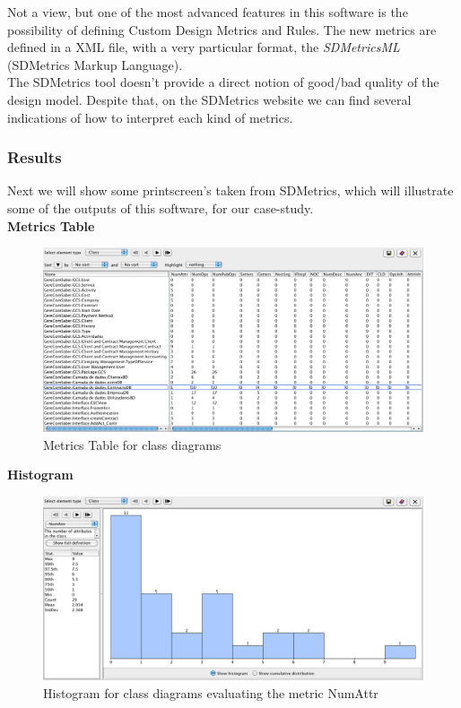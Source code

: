Not a view, but one of the most advanced features in this software is the possibility of defining Custom Design Metrics and Rules. The new metrics are defined in a XML file, with a very particular format, the \textit{SDMetricsML} (SDMetrics Markup Language). \\
The SDMetrics tool doesn't provide a direct notion of good/bad quality of the design model. Despite that, on the SDMetrics website we can find several indications of how to interpret each kind of metrics. 
 
\subsubsection{Results}

Next we will show some printscreen's taken from SDMetrics, which will illustrate some of the outputs of this software, for our case-study.\\

\textbf{Metrics Table}
\begin{figure}[H]
\begin{center}
\includegraphics[width=1\textwidth]{images/table.png}
\caption{Metrics Table for class diagrams}\label{img:table}
\end{center}
\end{figure} 

\textbf{Histogram}
\begin{figure}[H]
\begin{center}
\includegraphics[width=1\textwidth]{images/histogram.png}
\caption{Histogram for class diagrams evaluating the metric NumAttr}\label{img:histogram}
\end{center}
\end{figure} 

